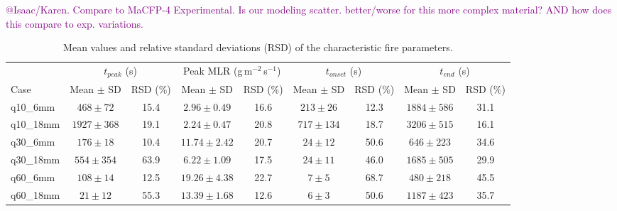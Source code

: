 \documentclass{article}
\begin{document}
\textcolor{purple}{@Isaac/Karen. Compare to MaCFP-4 Experimental. Is our modeling scatter. better/worse for this more complex material? AND how does this compare to exp. variations.
}
\begin{table}[b] 
	\centering
	\caption{Mean values and relative standard deviations (RSD) of the characteristic fire parameters.} \label{tab:FPA_stats_results} 
	\small 
	\begin{tabular}{lcccccccc} 
		\toprule 
		& \multicolumn{2}{c}{$t_{peak}$ (s)} 
		& \multicolumn{2}{c}{Peak MLR (g\,m$^{-2}$\,s$^{-1}$)} 
		& \multicolumn{2}{c}{$t_{onset}$ (s)} 
		& \multicolumn{2}{c}{$t_{end}$ (s)} \\ 
		\cmidrule(lr){2-3} 
		\cmidrule(lr){4-5} 
		\cmidrule(lr){6-7} 
		\cmidrule(lr){8-9} 
		Case & Mean $\pm$ SD & RSD (\%) 
		& Mean $\pm$ SD & RSD (\%) 
		& Mean $\pm$ SD & RSD (\%) 
		& Mean $\pm$ SD & RSD (\%) \\ 
		\midrule 
		q10\_6mm &
		$468 \pm 72$ &
		15.4 &
		$2.96 \pm 0.49$ &
		16.6 &
		$213 \pm 26$ &
		12.3 &
		$1884 \pm 586$ &
		31.1 \\ 
		
		q10\_18mm &
		$1927 \pm 368$ &
		19.1 &
		$2.24 \pm 0.47$ &
		20.8 &
		$717 \pm 134$ &
		18.7 &
		$3206 \pm 515$ &
		16.1 \\ 
		
		q30\_6mm &
		$176 \pm 18$ &
		10.4 &
		$11.74 \pm 2.42$ &
		20.7 &
		$24 \pm 12$ &
		50.6 &
		$646 \pm 223$ &
		34.6 \\ 
		
		q30\_18mm &
		$554 \pm 354$ &
		63.9 &
		$6.22 \pm 1.09$ &
		17.5 &
		$24 \pm 11$ &
		46.0 &
		$1685 \pm 505$ &
		29.9 \\ 
		
		q60\_6mm &
		$108 \pm 14$ &
		12.5 &
		$19.26 \pm 4.38$ &
		22.7 &
		$7 \pm 5$ &
		68.7 &
		$480 \pm 218$ &
		45.5 \\ 
		
		q60\_18mm &
		$21 \pm 12$ &
		55.3 &
		$13.39 \pm 1.68$ &
		12.6 &
		$6 \pm 3$ &
		50.6 &
		$1187 \pm 423$ &
		35.7 \\ 
		\bottomrule 
	\end{tabular} 
\end{table}
\clearpage
\end{document}
